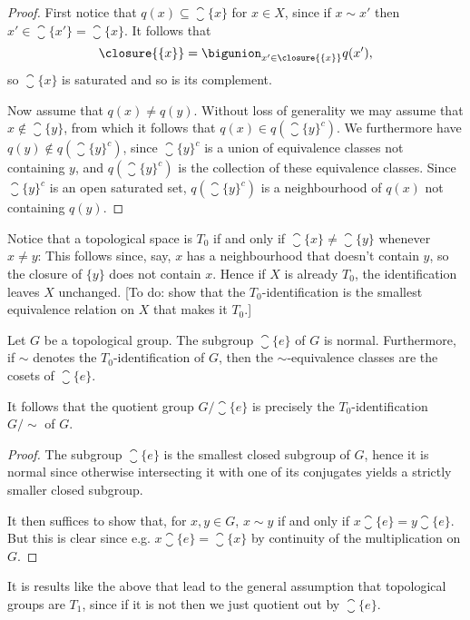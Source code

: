 \documentclass[article, a4paper, 11pt, oneside]{memoir}
\numberwithin{equation}{chapter}
\begin{document}
\begin{proof}
    First notice that $q(x) \subseteq \closure{\{x\}}$ for $x \in X$, since if $x \sim x'$ then $x' \in \closure{\{x'\}} = \closure{\{x\}}$. It follows that
    \begin{equation*}
        \closure{\{x\}}
            = \bigunion_{x' \in \closure{\{x\}}} q(x'),
    \end{equation*}
    so $\closure{\{x\}}$ is saturated and so is its complement.

    Now assume that $q(x) \neq q(y)$. Without loss of generality we may assume that $x \not\in \closure{\{y\}}$, from which it follows that $q(x) \in q(\closure{\{y\}}^c)$. We furthermore have $q(y) \not\in q(\closure{\{y\}}^c)$, since $\closure{\{y\}}^c$ is a union of equivalence classes not containing $y$, and $q(\closure{\{y\}}^c)$ is the collection of these equivalence classes. Since $\closure{\{y\}}^c$ is an open saturated set, $q(\closure{\{y\}}^c)$ is a neighbourhood of $q(x)$ not containing $q(y)$.
\end{proof}

Notice that a topological space is $T_0$ if and only if $\closure{\{x\}} \neq \closure{\{y\}}$ whenever $x \neq y$: This follows since, say, $x$ has a neighbourhood that doesn't contain $y$, so the closure of $\{y\}$ does not contain $x$. Hence if $X$ is already $T_0$, the identification leaves $X$ unchanged. [To do: show that the $T_0$-identification is the smallest equivalence relation on $X$ that makes it $T_0$.]

\begin{proposition}
    Let $G$ be a topological group. The subgroup $\closure{\{e\}}$ of $G$ is normal. Furthermore, if $\sim$ denotes the $T_0$-identification of $G$, then the $\sim$-equivalence classes are the cosets of $\closure{\{e\}}$.

    It follows that the quotient group $G / \closure{\{e\}}$ is precisely the $T_0$-identification $G/{\sim}$ of $G$.
\end{proposition}

\begin{proof}
    The subgroup $\closure{\{e\}}$ is the smallest closed subgroup of $G$, hence it is normal since otherwise intersecting it with one of its conjugates yields a strictly smaller closed subgroup.

    It then suffices to show that, for $x,y \in G$, $x \sim y$ if and only if $x \closure{\{e\}} = y \closure{\{e\}}$. But this is clear since e.g. $x \closure{\{e\}} = \closure{\{x\}}$ by continuity of the multiplication on $G$.
\end{proof}

It is results like the above that lead to the general assumption that topological groups are $T_1$, since if it is not then we just quotient out by $\closure{\{e\}}$.


\nocite{*}

\printbibliography
\end{document}
